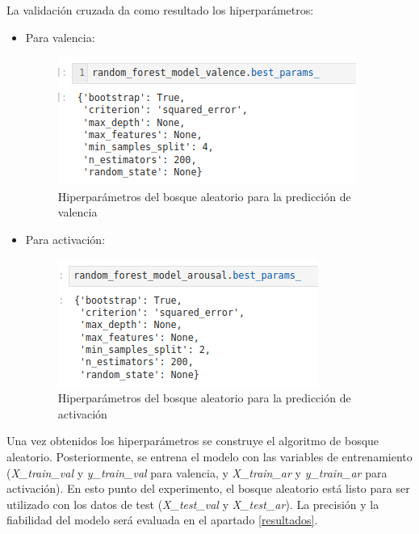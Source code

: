 \documentclass[12pt,a4paper,Spanish]{article}
\begin{document}
La validación cruzada da como resultado los hiperparámetros:
\begin{itemize}
	\item Para valencia:
	\begin{figure}[H]
		\centering
		\includegraphics[width=0.7\linewidth]{figs/final_params_random_forest_valence}
		\caption{Hiperparámetros del bosque aleatorio para la predicción de valencia}
		\label{fig:finalparamsrandomforestvalence}
	\end{figure}
	\item Para activación:
	\begin{figure}[H]
		\centering
		\includegraphics[width=0.7\linewidth]{figs/final_params_random_forest_arousal}
		\caption{Hiperparámetros del bosque aleatorio para la predicción de activación}
		\label{fig:finalparamsrandomforestarousal}
	\end{figure}
\end{itemize}
Una vez obtenidos los hiperparámetros se construye el algoritmo de bosque aleatorio. Posteriormente, se entrena el modelo con las variables de entrenamiento (\textit{X\_train\_val} y \textit{y\_train\_val} para valencia, y \textit{X\_train\_ar} y \textit{y\_train\_ar} para activación).
\newline
En esto punto del experimento, el bosque aleatorio está listo para ser utilizado con los datos de test (\textit{X\_test\_val} y \textit{X\_test\_ar}). La precisión y la fiabilidad del modelo será evaluada en el apartado \ref{resultados}.
\end{document}
